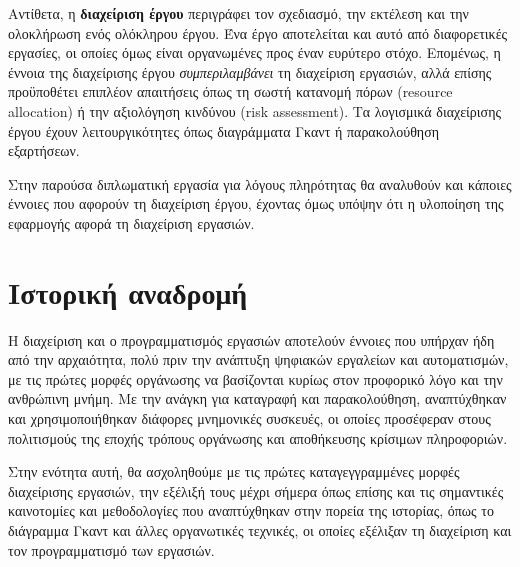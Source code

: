             Αντίθετα, η \textbf{διαχείριση έργου} περιγράφει τον σχεδιασμό, την εκτέλεση και την ολοκλήρωση ενός ολόκληρου έργου. Ένα έργο αποτελείται και αυτό από διαφορετικές εργασίες, οι οποίες όμως είναι οργανωμένες προς έναν ευρύτερο στόχο. Επομένως, η έννοια της διαχείρισης έργου \textit{συμπεριλαμβάνει} τη διαχείριση εργασιών, αλλά επίσης προϋποθέτει επιπλέον απαιτήσεις όπως τη σωστή κατανομή πόρων (resource allocation) ή την αξιολόγηση κινδύνου (risk assessment). Τα λογισμικά διαχείρισης έργου έχουν λειτουργικότητες όπως διαγράμματα Γκαντ ή παρακολούθηση εξαρτήσεων.

            Στην παρούσα διπλωματική εργασία για λόγους πληρότητας θα αναλυθούν και κάποιες έννοιες που αφορούν τη διαχείριση έργου, έχοντας όμως υπόψην ότι η υλοποίηση της εφαρμογής αφορά τη διαχείριση εργασιών.


    \section{Ιστορική αναδρομή}
        Η διαχείριση και ο προγραμματισμός εργασιών αποτελούν έννοιες που υπήρχαν ήδη από την αρχαιότητα, πολύ πριν την ανάπτυξη ψηφιακών εργαλείων και αυτοματισμών, με τις πρώτες μορφές οργάνωσης να βασίζονται κυρίως στον προφορικό λόγο και την ανθρώπινη μνήμη. Με την ανάγκη για καταγραφή και παρακολούθηση, αναπτύχθηκαν και χρησιμοποιήθηκαν διάφορες μνημονικές συσκευές, οι οποίες προσέφεραν στους πολιτισμούς της εποχής τρόπους οργάνωσης και αποθήκευσης κρίσιμων πληροφοριών.

        Στην ενότητα αυτή, θα ασχοληθούμε με τις πρώτες καταγεγγραμμένες μορφές διαχείρισης εργασιών, την εξέλιξή τους μέχρι σήμερα όπως επίσης και τις σημαντικές καινοτομίες και μεθοδολογίες που αναπτύχθηκαν στην πορεία της ιστορίας, όπως το διάγραμμα Γκαντ και άλλες οργανωτικές τεχνικές, οι οποίες εξέλιξαν τη διαχείριση και τον προγραμματισμό των εργασιών.


